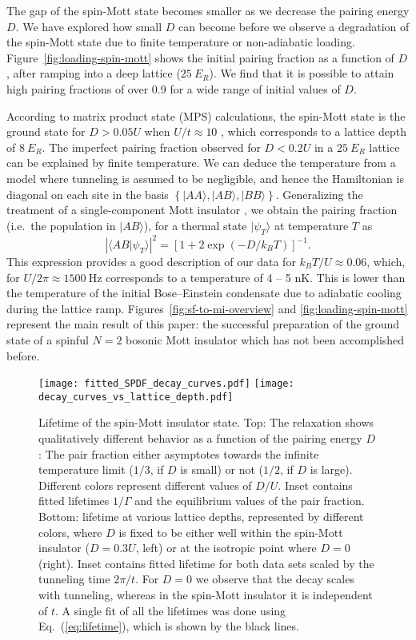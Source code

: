 \documentclass[aps,prl,twocolumn]{revtex4-1}
\begin{document}
The gap of the spin-Mott state becomes smaller as we decrease the pairing energy $D$.  We have explored how small $D$ can become before we observe a degradation of the spin-Mott state due to finite temperature or non-adiabatic loading.  Figure~\ref{fig:loading-spin-mott} shows the initial pairing fraction as a function of $D$, after ramping into a deep lattice ($25~E_R$). We find that it is possible to attain high pairing fractions of over 0.9 for a wide range of initial values of $D$. 

According to matrix product state (MPS) calculations, the spin-Mott state is the ground state for $D > 0.05 U$ when $U/t \approx 10$ \cite{Schachenmayer15}, which corresponds to a lattice depth of $8~E_R$. The imperfect pairing fraction observed for $D < 0.2 U$ in a $25~E_R$ lattice can be explained by finite temperature. We can deduce the temperature from a model where tunneling is assumed to be negligible, and hence the Hamiltonian is diagonal on each site in the basis $\left\{|AA\rangle,|AB\rangle,|BB\rangle\right\}$. Generalizing the treatment of a single-component Mott insulator \cite{Gerbier07}, we obtain the pairing fraction (i.e.\ the population in $|AB\rangle$), for a thermal state $|\psi_T\rangle$ at temperature $T$ as
\begin{equation}
    \label{eq:thermal-spdf}
    \left| \langle AB | \psi_T \rangle \right|^2 = \left[1 + 2\exp \left( -D/k_B T \right)\right]^{-1}.
\end{equation}
This expression provides a good description of our data for $k_B T/U \approx 0.06$, which, for $U/2\pi \approx 1500~\mathrm{Hz}$ corresponds to a temperature of 4 -- 5 nK. This is lower than the temperature of the initial Bose--Einstein condensate due to adiabatic cooling during the lattice ramp. Figures~\ref{fig:sf-to-mi-overview} and \ref{fig:loading-spin-mott} represent the main result of this paper:  the successful preparation of the ground state of a spinful $N=2$ bosonic Mott insulator which has not been accomplished before.


\begin{figure}
    \centering
    \texttt{[image: fitted\_SPDF\_decay\_curves.pdf]}
    \texttt{[image: decay\_curves\_vs\_lattice\_depth.pdf]}
    \caption{Lifetime of the spin-Mott insulator state. Top: The relaxation shows qualitatively different  behavior as a function of the pairing energy $D$: The  pair fraction either asymptotes towards the infinite temperature limit ($1/3$, if $D$ is small) or not ($1/2$, if $D$ is large). Different colors represent different values of $D/U$. Inset contains fitted lifetimes $1/\Gamma$ and the equi\-li\-bri\-um values of the pair fraction. Bottom: lifetime at various lattice depths, represented by different colors, where $D$ is fixed to be either well within the spin-Mott insulator ($D = 0.3U$, left) or at the isotropic point where $D = 0$ (right). Inset contains fitted lifetime for both data sets scaled by the tunneling time $2\pi/t$. For $D = 0$ we observe that the decay scales with tunneling, whereas in the spin-Mott insulator it is independent of $t$. A single fit of all the lifetimes was done using Eq.~(\ref{eq:lifetime}), which is shown by the black lines.}
    \label{fig:lifetime}
\end{figure}
\end{document}
